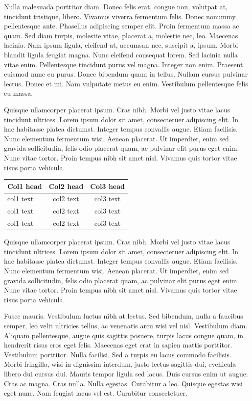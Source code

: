 \documentclass[AMA,Times1COL]{WileyNJDv5} %
\begin{document}
Nulla malesuada porttitor diam. Donec felis erat, congue non, volutpat at, tincidunt tristique, libero. Vivamus
viverra fermentum felis. Donec nonummy pellentesque ante. Phasellus adipiscing semper elit. Proin fermentum massa
ac quam. Sed diam turpis, molestie vitae, placerat a, molestie nec, leo. Maecenas lacinia. Nam ipsum ligula, eleifend
at, accumsan nec, suscipit a, ipsum. Morbi blandit ligula feugiat magna. Nunc eleifend consequat lorem. Sed lacinia
nulla vitae enim. Pellentesque tincidunt purus vel magna. Integer non enim. Praesent euismod nunc eu purus. Donec
bibendum quam in tellus. Nullam cursus pulvinar lectus. Donec et mi. Nam vulputate metus eu enim. Vestibulum
pellentesque felis eu massa.

Quisque ullamcorper placerat ipsum. Cras nibh. Morbi vel justo vitae lacus tincidunt ultrices. Lorem ipsum dolor sit
amet, consectetuer adipiscing elit. In hac habitasse platea dictumst. Integer tempus convallis augue. Etiam facilisis.
Nunc elementum fermentum wisi. Aenean placerat. Ut imperdiet, enim sed gravida sollicitudin, felis odio placerat
quam, ac pulvinar elit purus eget enim. Nunc vitae tortor. Proin tempus nibh sit amet nisl. Vivamus quis tortor
vitae risus porta vehicula.


\begin{center}
\begin{tabular*}{250pt}{@{\extracolsep\fill}lcc@{\extracolsep\fill}}%
\toprule
\textbf{Col1 head} & \textbf{Col2 head} & \textbf{Col3 head} \\
\midrule
col1 text & col2 text & col3 text \\
col1 text & col2 text & col3 text \\
col1 text & col2 text & col3 text \\
\bottomrule
\end{tabular*}
\end{center}


Quisque ullamcorper placerat ipsum. Cras nibh. Morbi vel justo vitae lacus tincidunt ultrices. Lorem ipsum dolor sit
amet, consectetuer adipiscing elit. In hac habitasse platea dictumst. Integer tempus convallis augue. Etiam facilisis.
Nunc elementum fermentum wisi. Aenean placerat. Ut imperdiet, enim sed gravida sollicitudin, felis odio placerat
quam, ac pulvinar elit purus eget enim. Nunc vitae tortor. Proin tempus nibh sit amet nisl. Vivamus quis tortor
vitae risus porta vehicula.

Fusce mauris. Vestibulum luctus nibh at lectus. Sed bibendum, nulla a faucibus semper, leo velit ultricies tellus, ac
venenatis arcu wisi vel nisl. Vestibulum diam. Aliquam pellentesque, augue quis sagittis posuere, turpis lacus congue
quam, in hendrerit risus eros eget felis. Maecenas eget erat in sapien mattis porttitor. Vestibulum porttitor. Nulla
facilisi. Sed a turpis eu lacus commodo facilisis. Morbi fringilla, wisi in dignissim interdum, justo lectus sagittis dui, evehicula libero dui cursus dui. Mauris tempor ligula sed lacus. Duis cursus enim ut augue. Cras ac magna. Cras nulla.
Nulla egestas. Curabitur a leo. Quisque egestas wisi eget nunc. Nam feugiat lacus vel est. Curabitur consectetuer.
\end{document}
